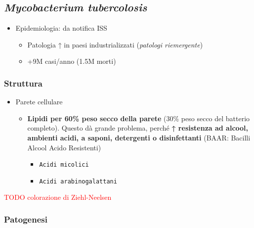 \documentclass[italian,]{article}
\providecommand{\tightlist}{%
  \setlength{\itemsep}{0pt}\setlength{\parskip}{0pt}}
\newcommand{\TODO}[1]{\textcolor{red}{\textsf{\footnotesize{TODO #1}}}} %
\begin{document}
\hypertarget{mycobacterium-tubercolosis}{%
\subsection{\texorpdfstring{\emph{Mycobacterium
tubercolosis}}{Mycobacterium tubercolosis}}\label{mycobacterium-tubercolosis}}

\begin{itemize}
\tightlist
\item
  Epidemiologia: da notifica ISS

  \begin{itemize}
  \tightlist
  \item
    Patologia ↑ in paesi industrializzati (\emph{patologi riemergente})
  \item
    +9M casi/anno (1.5M morti)
  \end{itemize}
\end{itemize}

\hypertarget{struttura-1}{%
\subsubsection{Struttura}\label{struttura-1}}

\begin{itemize}
\tightlist
\item
  Parete cellulare

  \begin{itemize}
  \tightlist
  \item
    \textbf{Lipidi per 60\% peso secco della parete} (30\% peso secco
    del batterio completo). Questo dà grande problema, perché \textbf{↑
    resistenza ad alcool, ambienti acidi, a saponi, detergenti o
    disinfettanti} (BAAR: Bacilli Alcool Acido Resistenti)

    \begin{itemize}
    \tightlist
    \item
      \texttt{Acidi\ micolici}
    \item
      \texttt{Acidi\ arabinogalattani}
    \end{itemize}
  \end{itemize}
\end{itemize}

\TODO{colorazione di Ziehl-Neelsen}

\hypertarget{patogenesi-1}{%
\subsubsection{Patogenesi}\label{patogenesi-1}}
\end{document}
